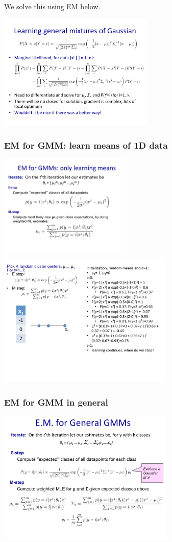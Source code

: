 We solve this using EM below. 

\includegraphics[width=2.9in]{figures/learning_general_mixtures_of_Gaussians.pdf}

\subsubsection{EM for GMM: learn means of 1D data}
\includegraphics[width=2.5in]{figures/gmm--means_only-1.pdf}

\includegraphics[width=3.3in]{figures/gmm--means_only-2.pdf}

\subsubsection{EM for GMM in general}

\includegraphics[width=3.3in]{figures/EM_for_GMM.pdf}

